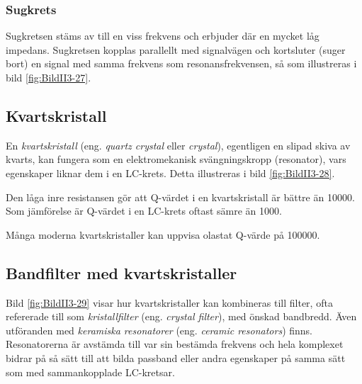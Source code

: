\subsubsection{Sugkrets}
Sugkretsen stäms av till en viss frekvens och erbjuder där en mycket låg
impedans.
Sugkretsen kopplas parallellt med signalvägen och kortsluter (suger bort) en
signal med samma frekvens som resonansfrekvensen, så som illustreras i bild
\ref{fig:BildII3-27}.

\subsection{Kvartskristall}



En \emph{kvartskristall} (eng. \emph{quartz crystal} eller \emph{crystal}),
egentligen en slipad skiva av kvarts, kan fungera som en
elektromekanisk svängningskropp (resonator), vars egenskaper liknar dem i en
LC-krets.
Detta illustreras i bild \ref{fig:BildII3-28}.

Den låga inre resistansen gör att Q-värdet i en kvartskristall är bättre än
10000.
Som jämförelse är Q-värdet i en LC-krets oftast sämre än 1000.

Många moderna kvartskristaller kan uppvisa olastat Q-värde på 100000.

\vspace{12pt} %

\subsection{Bandfilter med kvartskristaller}


Bild \ref{fig:BildII3-29} visar hur kvartskristaller kan kombineras till
filter, ofta refererade till som \emph{kristallfilter} (eng.
\emph{crystal filter}), med önskad bandbredd.
Även utföranden med \emph{keramiska resonatorer} (eng.
\emph{ceramic resonators}) finns.
Resonatorerna är avstämda till var sin bestämda frekvens och hela komplexet
bidrar på så sätt till att bilda passband eller andra egenskaper på samma sätt
som med sammankopplade LC-kretsar.


